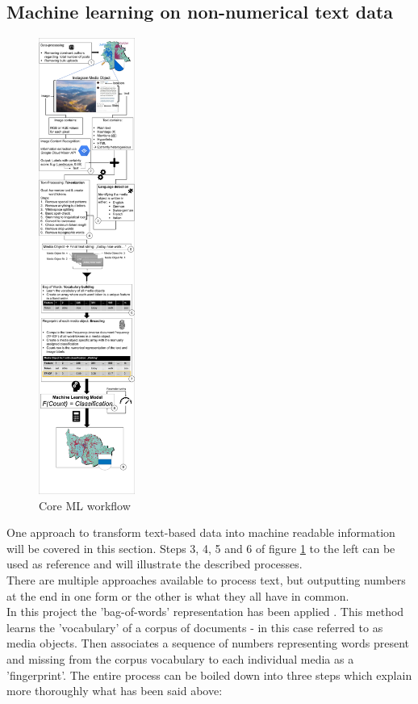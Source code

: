 \subsection{Machine learning on non-numerical text data} \label{ml_text_data}
\begin{figure} %
  \vspace{-0.5cm}
    \centerline{\includegraphics[trim={0 0 0 0},clip,width=0.28\textwidth]{img/ML_text_data_visualization_cropped.pdf}}
  \caption{Core ML workflow}
  \label{fig:ml_visualisation}
\end{figure}
One approach to transform text-based data into machine readable information will be covered in this section. Steps 3, 4, 5 and 6 of figure \ref{fig:ml_visualisation} to the left can be used as reference and will illustrate the described processes.\\
There are multiple approaches available to process text, but outputting numbers at the end in one form or the other is what they all have in common.\\
In this project the 'bag-of-words' representation has been applied \parencite{Joulin2016}. This method learns the 'vocabulary' of a corpus of documents - in this case referred to as media objects. Then associates a sequence of numbers representing words present and missing from the corpus vocabulary to each individual media as a 'fingerprint'. The entire process can be boiled down into three steps which explain more thoroughly what has been said above:

